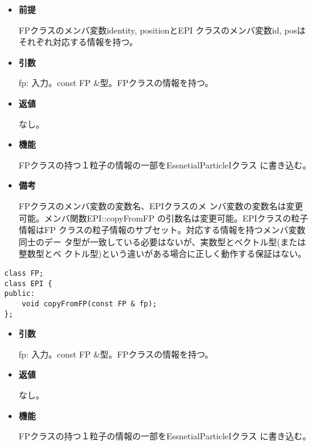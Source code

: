 \begin{itemize}

\item {\bf 前提}

  FPクラスのメンバ変数identity, positionとEPI
  クラスのメンバ変数id, posはそれぞれ対応する情報を持つ。

\item {\bf 引数}

  fp: 入力。const FP \&型。FPクラスの情報を持つ。
  
\item {\bf 返値}

  なし。
  
\item {\bf 機能}

  FPクラスの持つ１粒子の情報の一部をEssnetialParticleIクラス
  に書き込む。
  
\item {\bf 備考}

  FPクラスのメンバ変数の変数名、EPIクラスのメ
  ンバ変数の変数名は変更可能。メンバ関数EPI::copyFromFP
  の引数名は変更可能。EPIクラスの粒子情報はFP
  クラスの粒子情報のサブセット。対応する情報を持つメンバ変数同士のデー
  タ型が一致している必要はないが、実数型とベクトル型(または整数型とベ
  クトル型)という違いがある場合に正しく動作する保証はない。

\end{itemize}
\fi

\begin{screen}
\begin{verbatim}
class FP;
class EPI {
public:
    void copyFromFP(const FP & fp);
};
\end{verbatim}
\end{screen}

\begin{itemize}

\item {\bf 引数}

  fp: 入力。const FP \&型。FPクラスの情報を持つ。
  
\item {\bf 返値}

  なし。
  
\item {\bf 機能}

  FPクラスの持つ１粒子の情報の一部をEssnetialParticleIクラス
  に書き込む。
  
\end{itemize}

